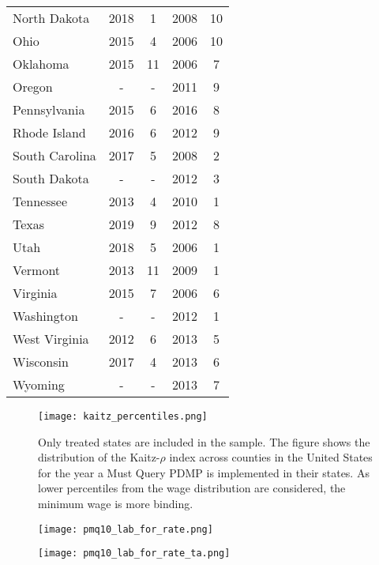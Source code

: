 \documentclass[12pt,a4paper]{article}
\begin{document}
\begin{longtable}[c]{lcccc}
    North Dakota & 2018 & 1 & 2008 & 10 \\
    Ohio & 2015 & 4 & 2006 & 10 \\
    Oklahoma & 2015 & 11 & 2006 & 7 \\
    Oregon & - & - & 2011 & 9 \\
    Pennsylvania & 2015 & 6 & 2016 & 8 \\
    Rhode Island & 2016 & 6 & 2012 & 9 \\
    South Carolina & 2017 & 5 & 2008 & 2 \\
    South Dakota & - & - & 2012 & 3 \\
    Tennessee & 2013 & 4 & 2010 & 1 \\
    Texas & 2019 & 9 & 2012 & 8 \\
    Utah & 2018 & 5 & 2006 & 1 \\
    Vermont & 2013 & 11 & 2009 & 1 \\
    Virginia & 2015 & 7 & 2006 & 6 \\
    Washington & - & - & 2012 & 1 \\
    West Virginia & 2012 & 6 & 2013 & 5 \\
    Wisconsin & 2017 & 4 & 2013 & 6 \\
    Wyoming & - & - & 2013 & 7 \\

\end{longtable}

\newpage

\begin{figure}[htbp]
    \centering
    \texttt{[image: kaitz\_percentiles.png]}
    \caption{Only treated states are included in the sample. The figure shows the distribution of the Kaitz-\(\rho\) index across counties in the United States for the year a Must Query PDMP is implemented in their states. As lower percentiles from the wage distribution are considered, the minimum wage is more binding.}
    \label{fig:kaitz_perc}
\end{figure}

\newpage

\begin{figure}[htbp]
    \centering
    \texttt{[image: pmq10\_lab\_for\_rate.png]}
    \caption{}
    \label{fig:lab_for_rate}
\end{figure}

\newpage

\begin{figure}[htbp]
    \centering
    \texttt{[image: pmq10\_lab\_for\_rate\_ta.png]}
    \caption{}
    \label{fig:lab_for_rate_ta}
\end{figure}
\end{document}
